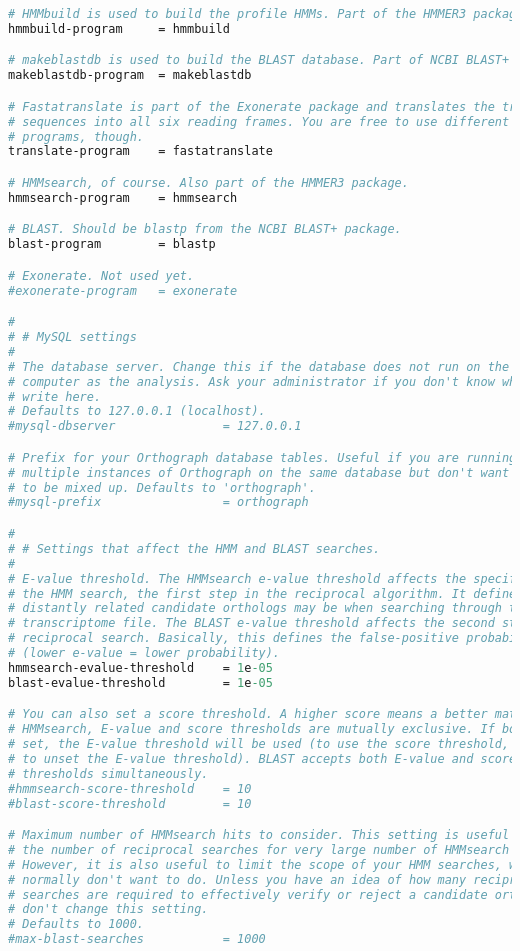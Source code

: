 \begin{lstlisting}[language=perl]
# HMMbuild is used to build the profile HMMs. Part of the HMMER3 package.
hmmbuild-program     = hmmbuild

# makeblastdb is used to build the BLAST database. Part of NCBI BLAST+
makeblastdb-program  = makeblastdb

# Fastatranslate is part of the Exonerate package and translates the transcript
# sequences into all six reading frames. You are free to use different
# programs, though.
translate-program    = fastatranslate

# HMMsearch, of course. Also part of the HMMER3 package.
hmmsearch-program    = hmmsearch

# BLAST. Should be blastp from the NCBI BLAST+ package.
blast-program        = blastp

# Exonerate. Not used yet.
#exonerate-program   = exonerate

#
# # MySQL settings
#
# The database server. Change this if the database does not run on the same
# computer as the analysis. Ask your administrator if you don't know what to
# write here.
# Defaults to 127.0.0.1 (localhost).
#mysql-dbserver               = 127.0.0.1

# Prefix for your Orthograph database tables. Useful if you are running
# multiple instances of Orthograph on the same database but don't want the data
# to be mixed up. Defaults to 'orthograph'.
#mysql-prefix                 = orthograph

#
# # Settings that affect the HMM and BLAST searches.
#
# E-value threshold. The HMMsearch e-value threshold affects the specificity of
# the HMM search, the first step in the reciprocal algorithm. It defines how
# distantly related candidate orthologs may be when searching through the
# transcriptome file. The BLAST e-value threshold affects the second step, the
# reciprocal search. Basically, this defines the false-positive probability
# (lower e-value = lower probability).
hmmsearch-evalue-threshold    = 1e-05
blast-evalue-threshold        = 1e-05

# You can also set a score threshold. A higher score means a better match. For
# HMMsearch, E-value and score thresholds are mutually exclusive. If both are
# set, the E-value threshold will be used (to use the score threshold, you have
# to unset the E-value threshold). BLAST accepts both E-value and score
# thresholds simultaneously.
#hmmsearch-score-threshold	  = 10
#blast-score-threshold        = 10

# Maximum number of HMMsearch hits to consider. This setting is useful to limit
# the number of reciprocal searches for very large number of HMMsearch hits.
# However, it is also useful to limit the scope of your HMM searches, which you
# normally don't want to do. Unless you have an idea of how many reciprocal
# searches are required to effectively verify or reject a candidate ortholog,
# don't change this setting. 
# Defaults to 1000.
#max-blast-searches           = 1000


\end{lstlisting}
